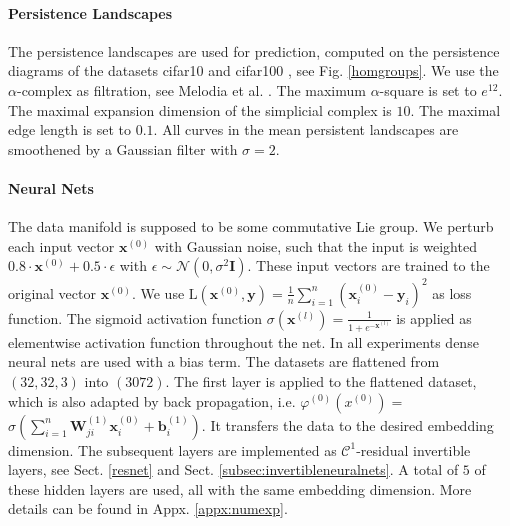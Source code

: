 \documentclass[envcountsect,runningheads]{llncs}
\begin{document}
\paragraph{Persistence Landscapes} The persistence landscapes are used for prediction, computed on the persistence diagrams of the datasets cifar10 and cifar100 , see Fig. \ref{homgroups}. We use the $\alpha$-complex as filtration, see Melodia et al. . The maximum $\alpha$-square is set to $e^{12}$. The maximal expansion dimension of the simplicial complex is $10$. The maximal edge length is set to $0.1$. All curves in the mean persistent landscapes are smoothened by a Gaussian filter with $\sigma = 2$.


\paragraph{Neural Nets} The data manifold is supposed to be some commutative Lie group. We perturb each input vector $\textbf{x}^{(0)}$ with Gaussian noise, such that the input is weighted $0.8 \cdot \textbf{x}^{(0)} + 0.5 \cdot \epsilon$ with $\epsilon \sim \mathcal{N}(0,\sigma^2 \mathbf{I})$. These input vectors are trained to the original vector $\textbf{x}^{(0)}$. We use $\text{L}(\textbf{x}^{(0)}, \textbf{y}) = \frac{1}{n} \sum_{i=1}^{n} \left(\textbf{x}^{(0)}_i-\textbf{y}_i\right)^2$ as loss function. The sigmoid activation function $\sigma(\mathbf{x}^{(l)}) = \frac{1}{1 + e^{-\mathbf{x}^{(l)}}}$ is applied as elementwise activation function throughout the net. In all experiments dense neural nets are used with a bias term. The datasets are flattened from $(32,32,3)$ into $(3072)$. The first layer is applied to the flattened dataset, which is also adapted by back propagation, i.e. $\varphi^{(0)}\left(x^{(0)} \right) =$ $\sigma\left( \sum_{i=1}^{n} \textbf{W}_{ji}^{(1)} \textbf{x}_{i}^{(0)} + \textbf{b}_{i}^{(1)} \right)$. It transfers the data to the desired embedding dimension. The subsequent layers are implemented as $\mathcal{C}^1$-residual invertible layers, see Sect. \ref{resnet} and Sect. \ref{subsec:invertibleneuralnets}. A total of $5$ of these hidden layers are used, all with the same embedding dimension. More details can be found in Appx. \ref{appx:numexp}.
\end{document}
